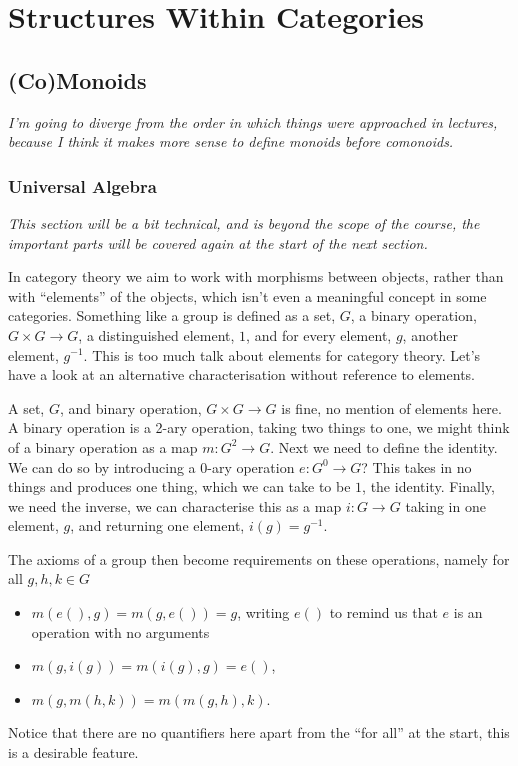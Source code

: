 \documentclass[fleqn]{NotesClass}
\begin{document}
    \part{Structures Within Categories}
    \chapter{(Co)Monoids}
    \textit{I'm going to diverge from the order in which things were approached in lectures, because I think it makes more sense to define monoids before comonoids.}
    
    \section{Universal Algebra}
    \textit{This section will be a bit technical, and is beyond the scope of the course, the important parts will be covered again at the start of the next section.}
    
    In category theory we aim to work with morphisms between objects, rather than with \enquote{elements} of the objects, which isn't even a meaningful concept in some categories.
    Something like a group is defined as a set, \(G\), a binary operation, \(G \times G \to G\), a distinguished element, \(1\), and for every element, \(g\), another element, \(g^{-1}\).
    This is too much talk about elements for category theory.
    Let's have a look at an alternative characterisation without reference to elements.
    
    A set, \(G\), and binary operation, \(G \times G \to G\) is fine, no mention of elements here.
    A binary operation is a 2-ary operation, taking two things to one, we might think of a binary operation as a map \(m \colon G^2 \to G\).
    Next we need to define the identity.
    We can do so by introducing a 0-ary operation \(e \colon G^0 \to G\)?
    This takes in no things and produces one thing, which we can take to be \(1\), the identity.
    Finally, we need the inverse, we can characterise this as a map \(i \colon G \to G\) taking in one element, \(g\), and returning one element, \(i(g) = g^{-1}\).
    
    The axioms of a group then become requirements on these operations, namely for all \(g, h, k \in G\)
    \begin{itemize}
        \item \(m(e(), g) = m(g, e()) = g\), writing \(e()\) to remind us that \(e\) is an operation with no arguments
        \item \(m(g, i(g)) = m(i(g), g) = e()\),
        \item \(m(g, m(h, k)) = m(m(g, h), k)\).
    \end{itemize}
    Notice that there are no quantifiers here apart from the \enquote{for all} at the start, this is a desirable feature.
    
\end{document}
